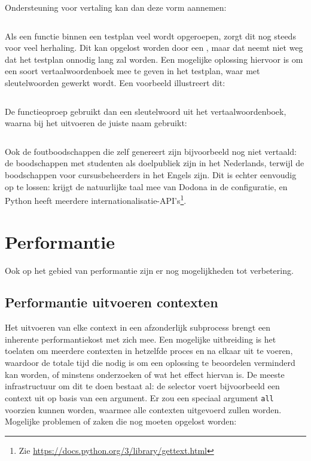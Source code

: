 \inputminted{json}{code/example-name.json}

Ondersteuning voor vertaling kan dan deze vorm aannemen:

\inputminted{json}{code/example-name-trans.json}

Als een functie binnen een testplan veel wordt opgeroepen, zorgt dit nog steeds voor veel herhaling.
Dit kan opgelost worden door een , maar dat neemt niet weg dat het testplan onnodig lang zal worden.
Een mogelijke oplossing hiervoor is om een soort vertaalwoordenboek mee te geven in het testplan, waar met sleutelwoorden gewerkt wordt.
Een voorbeeld illustreert dit:

\inputminted{json}{code/example-name-dict.json}

De functieoproep gebruikt dan een sleutelwoord uit het vertaalwoordenboek, waarna \tested{} bij het uitvoeren de juiste naam gebruikt:

\inputminted{json}{code/example-name-key.json}

Ook de foutboodschappen die \tested{} zelf genereert zijn bijvoorbeeld nog niet vertaald: de boodschappen met studenten als doelpubliek zijn in het Nederlands, terwijl de boodschappen voor cursusbeheerders in het Engels zijn.
Dit is echter eenvoudig op te lossen: \tested{} krijgt de natuurlijke taal mee van Dodona in de configuratie, en Python heeft meerdere internationalisatie-API's\footnote{Zie \url{https://docs.python.org/3/library/gettext.html}}.

\section{Performantie}\label{sec:future-performantie}

Ook op het gebied van performantie zijn er nog mogelijkheden tot verbetering.

\subsection{Performantie uitvoeren contexten}\label{subsec:future-performance}

Het uitvoeren van elke context in een afzonderlijk subprocess brengt een inherente performantiekost met zich mee.
Een mogelijke uitbreiding is het toelaten om meerdere contexten in hetzelfde proces en na elkaar uit te voeren, waardoor de totale tijd die nodig is om een oplossing te beoordelen verminderd kan worden, of minstens onderzoeken of wat het effect hiervan is.
De meeste infrastructuur om dit te doen bestaat al: de selector voert bijvoorbeeld een context uit op basis van een argument.
Er zou een speciaal argument \texttt{all} voorzien kunnen worden, waarmee alle contexten uitgevoerd zullen worden.
Mogelijke problemen of zaken die nog moeten opgelost worden:

